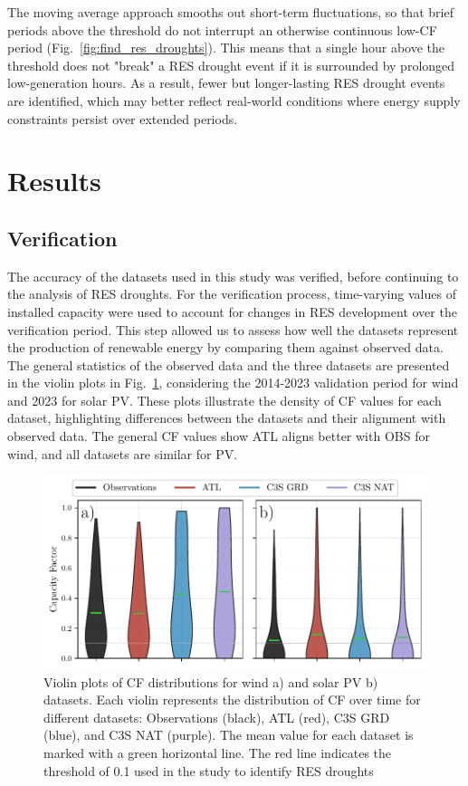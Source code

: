 \documentclass[preprint, 12pt]{elsarticle}
\begin{document}
The moving average approach smooths out short-term fluctuations, so that brief periods above the threshold do not interrupt an otherwise continuous low-CF period (Fig.~\ref{fig:find_res_droughts}). This means that a single hour above the threshold does not "break" a RES drought event if it is surrounded by prolonged low-generation hours. As a result, fewer but longer-lasting RES drought events are identified, which may better reflect real-world conditions where energy supply constraints persist over extended periods.

\section{Results}
\label{sec:results}

\subsection{Verification}
\label{sec:verification}

The accuracy of the datasets used in this study was verified, before continuing to the analysis of RES droughts. For the verification process, time-varying values of installed capacity were used to account for changes in RES development over the verification period. This step allowed us to assess how well the datasets represent the production of renewable energy by comparing them against observed data. The general statistics of the observed data and the three datasets are presented in the violin plots in Fig.~\ref{fig:violin_plots}, considering the 2014-2023 validation period for wind and 2023 for solar PV. These plots illustrate the density of CF values for each dataset, highlighting differences between the datasets and their alignment with observed data. The general CF values show ATL aligns better with OBS for wind, and all datasets are similar for PV.

\begin{figure}[ht!]
	\centering
	\includegraphics[width=\textwidth]{violin_plots_verification.pdf}
	\caption{Violin plots of CF distributions for wind a) and solar PV b) datasets. Each violin represents the distribution of CF over time for different datasets: Observations (black), ATL (red), C3S GRD (blue), and C3S NAT (purple). The mean value for each dataset is marked with a green horizontal line. The red line indicates the threshold of 0.1 used in the study to identify RES droughts}
	\label{fig:violin_plots}
\end{figure}
\end{document}
